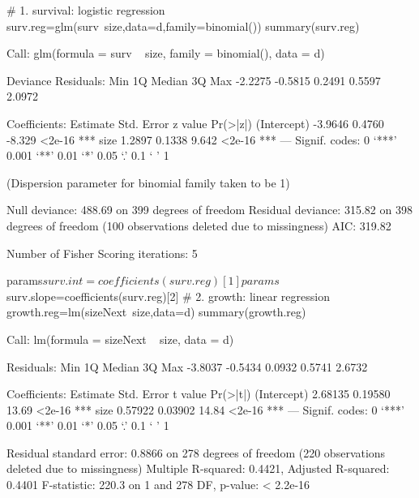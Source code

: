 \documentclass[11pt]{article}
\begin{document}
\begin{Schunk}
\begin{Sinput}
 # 1. survival: logistic regression
 surv.reg=glm(surv~size,data=d,family=binomial())
 summary(surv.reg)
\end{Sinput}
\begin{Soutput}
Call:
glm(formula = surv ~ size, family = binomial(), data = d)

Deviance Residuals: 
    Min       1Q   Median       3Q      Max  
-2.2275  -0.5815   0.2491   0.5597   2.0972  

Coefficients:
            Estimate Std. Error z value Pr(>|z|)    
(Intercept)  -3.9646     0.4760  -8.329   <2e-16 ***
size          1.2897     0.1338   9.642   <2e-16 ***
---
Signif. codes:  
0 ‘***’ 0.001 ‘**’ 0.01 ‘*’ 0.05 ‘.’ 0.1 ‘ ’ 1

(Dispersion parameter for binomial family taken to be 1)

    Null deviance: 488.69  on 399  degrees of freedom
Residual deviance: 315.82  on 398  degrees of freedom
  (100 observations deleted due to missingness)
AIC: 319.82

Number of Fisher Scoring iterations: 5
\end{Soutput}
\begin{Sinput}
 params$surv.int=coefficients(surv.reg)[1]
 params$surv.slope=coefficients(surv.reg)[2]
 # 2. growth: linear regression
 growth.reg=lm(sizeNext~size,data=d)
 summary(growth.reg)
\end{Sinput}
\begin{Soutput}
Call:
lm(formula = sizeNext ~ size, data = d)

Residuals:
    Min      1Q  Median      3Q     Max 
-3.8037 -0.5434  0.0932  0.5741  2.6732 

Coefficients:
            Estimate Std. Error t value Pr(>|t|)    
(Intercept)  2.68135    0.19580   13.69   <2e-16 ***
size         0.57922    0.03902   14.84   <2e-16 ***
---
Signif. codes:  
0 ‘***’ 0.001 ‘**’ 0.01 ‘*’ 0.05 ‘.’ 0.1 ‘ ’ 1

Residual standard error: 0.8866 on 278 degrees of freedom
  (220 observations deleted due to missingness)
Multiple R-squared:  0.4421,	Adjusted R-squared:  0.4401 
F-statistic: 220.3 on 1 and 278 DF,  p-value: < 2.2e-16
\end{Soutput}
\end{Schunk}
  
\end{document}
